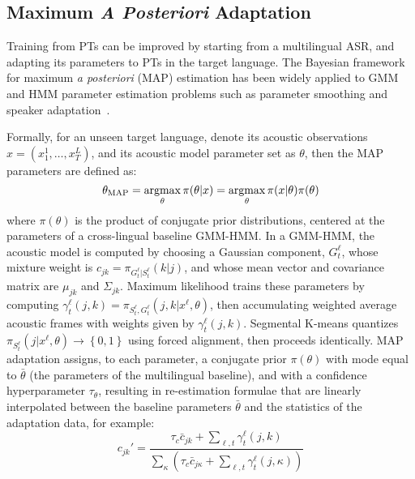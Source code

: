 \subsection{Maximum {\em A Posteriori} Adaptation}
\label{sec:adaptation}

Training from PTs can be improved by starting from a multilingual ASR,
and adapting its parameters to PTs in the target language.  The
Bayesian framework for maximum {\em a posteriori} (MAP) estimation
has been widely applied to GMM and HMM parameter estimation problems
such as parameter smoothing and speaker
adaptation~\cite{gauvain1994maximum}.

Formally, for an unseen target language, denote its acoustic
observations $x = ( x_1^1, \ldots, x_{T}^L )$, and its acoustic model
parameter set as $\theta$, then the MAP parameters are defined as:
\begin{equation}
  \theta_{\mathrm{MAP}}  = \argmax_{\theta} \pi(\theta | x) 
= \argmax_{\theta} \pi( x | \theta ) \pi(\theta)
\label{eq:map}
\end{equation}
\noindent where $\pi(\theta)$ is the product of conjugate
prior distributions, centered at the parameters of a cross-lingual
baseline GMM-HMM.  In a GMM-HMM, the acoustic model 
is computed by choosing a Gaussian component, $G_t^\ell$, whose mixture
weight is $c_{jk}=\pi_{G_t^{\ell}|S_t^{\ell}}(k|j)$, and whose mean vector
and covariance matrix are $\mu_{jk}$ and $\Sigma_{jk}$.  Maximum
likelihood trains these parameters by computing
$\gamma^{\ell}_t(j,k)=\pi_{S_t^{\ell},G_t^{\ell}}(j,k|x^\ell,\theta)$,
then accumulating weighted average acoustic frames with weights given
by $\gamma_{t}^\ell(j,k)$. Segmental K-means quantizes
$\pi_{S_t^\ell}(j|x^\ell,\theta)\rightarrow\left\{0,1\right\}$ using forced
alignment, then proceeds identically.  MAP adaptation assigns, to each
parameter, a conjugate prior $\pi(\theta)$ with mode equal to
$\bar\theta$ (the parameters of the multilingual baseline), and with a
confidence hyperparameter $\tau_\theta$, resulting in re-estimation
formulae that are linearly interpolated between the baseline
parameters $\bar\theta$ and the statistics of the adaptation data, for
example:
\begin{equation}
c_{jk}'=\frac{\tau_c\bar{c}_{jk}+\sum_{\ell,t}\gamma_{t}^\ell(j,k)}
{\sum_{\kappa}\left(\tau_c\bar{c}_{j\kappa}+
  \sum_{\ell,t}\gamma_{t}^\ell(j,\kappa)\right)}
\end{equation}


